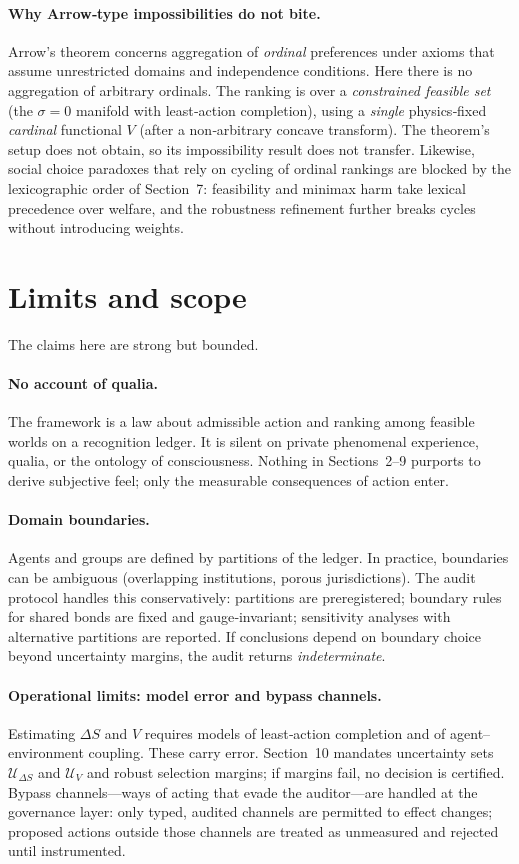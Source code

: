 \documentclass[11pt]{article}
\begin{document}
\paragraph{Why Arrow‑type impossibilities do not bite.}
Arrow’s theorem concerns aggregation of \emph{ordinal} preferences under axioms that assume unrestricted domains and independence conditions. Here there is no aggregation of arbitrary ordinals. The ranking is over a \emph{constrained feasible set} (the $\sigma=0$ manifold with least‑action completion), using a \emph{single} physics‑fixed \emph{cardinal} functional $V$ (after a non‑arbitrary concave transform). The theorem’s setup does not obtain, so its impossibility result does not transfer. Likewise, social choice paradoxes that rely on cycling of ordinal rankings are blocked by the lexicographic order of Section~7: feasibility and minimax harm take lexical precedence over welfare, and the robustness refinement further breaks cycles without introducing weights.

\section{Limits and scope}

The claims here are strong but bounded.

\paragraph{No account of qualia.}
The framework is a law about admissible action and ranking among feasible worlds on a recognition ledger. It is silent on private phenomenal experience, qualia, or the ontology of consciousness. Nothing in Sections~2–9 purports to derive subjective feel; only the measurable consequences of action enter.

\paragraph{Domain boundaries.}
Agents and groups are defined by partitions of the ledger. In practice, boundaries can be ambiguous (overlapping institutions, porous jurisdictions). The audit protocol handles this conservatively: partitions are preregistered; boundary rules for shared bonds are fixed and gauge‑invariant; sensitivity analyses with alternative partitions are reported. If conclusions depend on boundary choice beyond uncertainty margins, the audit returns \emph{indeterminate}.

\paragraph{Operational limits: model error and bypass channels.}
Estimating $\Delta S$ and $V$ requires models of least‑action completion and of agent–environment coupling. These carry error. Section~10 mandates uncertainty sets $\mathcal{U}_{\Delta S}$ and $\mathcal{U}_V$ and robust selection margins; if margins fail, no decision is certified. Bypass channels—ways of acting that evade the auditor—are handled at the governance layer: only typed, audited channels are permitted to effect changes; proposed actions outside those channels are treated as unmeasured and rejected until instrumented.
\end{document}
